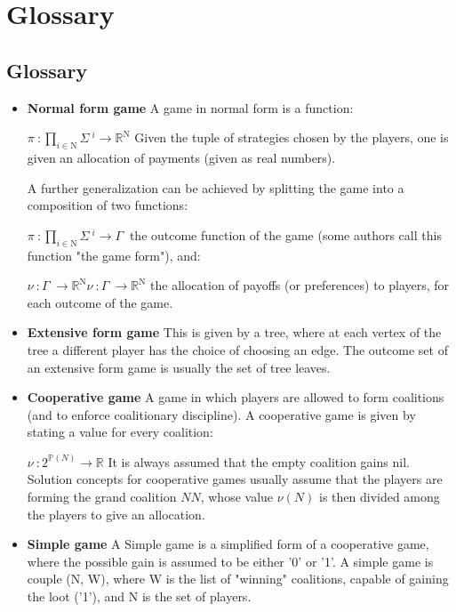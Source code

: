 \documentclass[]{report}
\begin{document}
\chapter{Glossary}
\section{Glossary}

\begin{itemize}
	\item \textbf{Normal form game}
	A game in normal form is a function:
	
	${\displaystyle \pi \ :\prod _{i\in \mathrm {N} }\Sigma \ ^{i}\to \mathbb {R} ^{\mathrm {N} }} $
	Given the tuple of strategies chosen by the players, one is given an allocation of payments (given as real numbers).
	
	A further generalization can be achieved by splitting the game into a composition of two functions:
	
	${\displaystyle \pi \ :\prod _{i\in \mathrm {N} }\Sigma \ ^{i}\to \Gamma \ } $
	the outcome function of the game (some authors call this function "the game form"), and:
	
	${\displaystyle \nu \ :\Gamma \ \to \mathbb {R} ^{\mathrm {N} }} \nu \ :\Gamma \ \to \mathbb {R} ^{\mathrm {N} }$
	the allocation of payoffs (or preferences) to players, for each outcome of the game.
	
	\item \textbf{Extensive form game}
	This is given by a tree, where at each vertex of the tree a different player has the choice of choosing an edge. The outcome set of an extensive form game is usually the set of tree leaves.
	
	\item \textbf{Cooperative game}
	A game in which players are allowed to form coalitions (and to enforce coalitionary discipline). A cooperative game is given by stating a value for every coalition:
	
	${\displaystyle \nu \ :2^{\mathbb {P} (N)}\to \mathbb {R} }$
	It is always assumed that the empty coalition gains nil. Solution concepts for cooperative games usually assume that the players are forming the grand coalition ${\displaystyle N} N$, whose value ${\displaystyle \nu (N)}$ is then divided among the players to give an allocation.
	
	\item \textbf{Simple game}
	A Simple game is a simplified form of a cooperative game, where the possible gain is assumed to be either '0' or '1'. A simple game is couple (N, W), where W is the list of "winning" coalitions, capable of gaining the loot ('1'), and N is the set of players.
	

\end{itemize}
\end{document}

